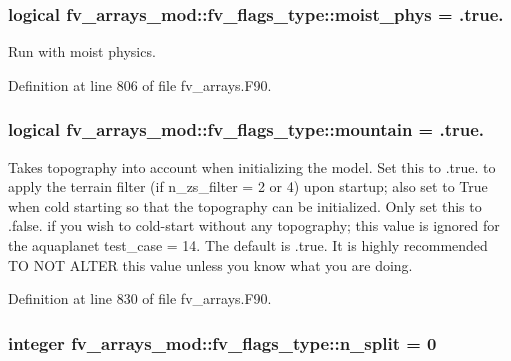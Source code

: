 \subsubsection[{moist\-\_\-phys}]{\setlength{\rightskip}{0pt plus 5cm}logical fv\-\_\-arrays\-\_\-mod\-::fv\-\_\-flags\-\_\-type\-::moist\-\_\-phys = .true.}\label{structfv__arrays__mod_1_1fv__flags__type_a0c6144d2c4d8315584cd4ddb8b2a4ba7}


Run with moist physics. 



Definition at line 806 of file fv\-\_\-arrays.\-F90.

\subsubsection[{mountain}]{\setlength{\rightskip}{0pt plus 5cm}logical fv\-\_\-arrays\-\_\-mod\-::fv\-\_\-flags\-\_\-type\-::mountain = .true.}\label{structfv__arrays__mod_1_1fv__flags__type_ab0200da2e7fbf552254b20195d89808b}


Takes topography into account when initializing the model. Set this to .true. to apply the terrain filter (if n\-\_\-zs\-\_\-filter = 2 or 4) upon startup; also set to True when cold starting so that the topography can be initialized. Only set this to .false. if you wish to cold-\/start without any topography; this value is ignored for the aquaplanet test\-\_\-case = 14. The default is .true. It is highly recommended T\-O N\-O\-T A\-L\-T\-E\-R this value unless you know what you are doing. 



Definition at line 830 of file fv\-\_\-arrays.\-F90.

\subsubsection[{n\-\_\-split}]{\setlength{\rightskip}{0pt plus 5cm}integer fv\-\_\-arrays\-\_\-mod\-::fv\-\_\-flags\-\_\-type\-::n\-\_\-split = 0}\label{structfv__arrays__mod_1_1fv__flags__type_afe4a5c83b6de70b849935c4947ca5205}


